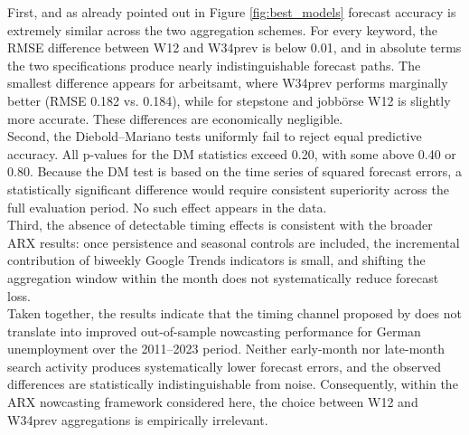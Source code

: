 \documentclass[12pt,a4paper]{article}
\begin{document}
First, and as already pointed out in Figure \ref{fig:best_models} forecast accuracy is extremely similar across the two aggregation schemes.
For every keyword, the RMSE difference between W12 and W34prev is below 0.01, and in absolute terms the two specifications produce nearly indistinguishable forecast paths.
The smallest difference appears for arbeitsamt, where W34prev performs marginally better (RMSE 0.182 vs. 0.184), while for stepstone and jobbörse W12 is slightly more accurate. These differences are economically negligible.\\
Second, the Diebold–Mariano tests uniformly fail to reject equal predictive accuracy.
All p-values for the DM statistics exceed 0.20, with some above 0.40 or 0.80.
Because the DM test is based on the time series of squared forecast errors, a statistically significant difference would require consistent superiority across the full evaluation period. No such effect appears in the data.\\
Third, the absence of detectable timing effects is consistent with the broader ARX results: once persistence and seasonal controls are included, the incremental contribution of biweekly Google Trends indicators is small, and shifting the aggregation window within the month does not systematically reduce forecast loss.\\
Taken together, the results indicate that the timing channel proposed by \citet{Askitas} does not translate into improved out-of-sample nowcasting performance for German unemployment over the 2011–2023 period. Neither early-month nor late-month search activity produces systematically lower forecast errors, and the observed differences are statistically indistinguishable from noise. Consequently, within the ARX nowcasting framework considered here, the choice between W12 and W34prev aggregations is empirically irrelevant.
\end{document}
